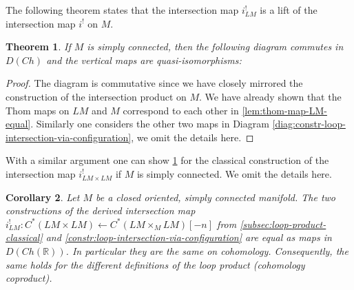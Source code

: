 \documentclass{scrartcl}
\theoremstyle{plain}
\newtheorem{theorem}{Theorem}[section]
\newtheorem{corollary}[theorem]{Corollary}
\theoremstyle{definition}
\newtheorem{remark}[theorem]{Remark}
\newcommand{\R}{\mathbb R}
\newcommand{\quiso}{\simeq}
\newcommand{\from}{\leftarrow}
\DeclareMathOperator{\id}{id}
\begin{document}
The following theorem states that the intersection map $i^!_{LM}$ is a lift of the intersection map $i^!$ on $M$.
\begin{theorem}\label{thm:loop-intersection-map-product}
    If $M$ is simply connected, then the following diagram commutes in $D(Ch)$ and the vertical maps are quasi-isomorphisms:
    \begin{center}
    \end{center}
\end{theorem}
\begin{proof}
    The diagram is commutative since we have closely mirrored the construction of the intersection product on $M$. We have already shown that the Thom maps on $LM$ and $M$ correspond to each other in \cref{lem:thom-map-LM-equal}. Similarly one considers the other two maps in Diagram \ref{diag:constr-loop-intersection-via-configuration}, we omit the details here.
\end{proof}

With a similar argument one can show \cref{thm:loop-intersection-map-product} for the classical construction of the intersection map $i^!_{LM\times LM}$ if $M$ is simply connected. We omit the details here. 

\begin{corollary}\label{thm:loop-products-identity}
    Let $M$ be a closed oriented, simply connected manifold. The two constructions of the derived intersection map $i^!_{LM}\colon C^*(LM\times LM) \from C^{*}(LM\times_M LM)[-n]$ from \cref{subsec:loop-product-classical} and \cref{constr:loop-intersection-via-configuration} are equal as maps in $D(Ch(\R))$. In particular they are the same on cohomology. Consequently, the same holds for the different definitions of the loop product (cohomology coproduct).
\end{corollary}


\end{document}
